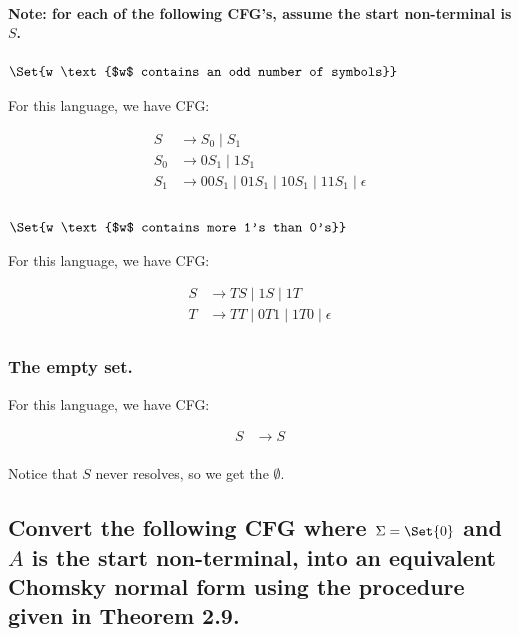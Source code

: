 \documentclass{article}
\providecommand\given{} %
\begin{document}
\paragraph{Note: for each of the following CFG's, assume the start non-terminal is $S$.}

\subsubsection{$\Set{w \given \text{$w$ contains an odd number of symbols}}$}

For this language, we have CFG:

\begin{align*}
	S   & \longrightarrow S_0 \;|\; S_1                                            \\
	S_0 & \longrightarrow 0S_1 \;|\; 1S_1                                          \\
	S_1 & \longrightarrow 00S_1 \;|\; 01S_1 \;|\; 10S_1 \;|\; 11S_1 \;|\; \epsilon \\
\end{align*}

\subsubsection{$\Set{w \given \text{$w$ contains more 1's than 0's}}$}

For this language, we have CFG:

\begin{align*}
	S & \longrightarrow TS \;|\; 1S \;|\; 1T                  \\
	T & \longrightarrow TT \;|\; 0T1 \;|\; 1T0 \;|\; \epsilon \\
\end{align*}

\subsubsection{The empty set.}

For this language, we have CFG:

\begin{align*}
	S & \longrightarrow S \\
\end{align*}

Notice that $S$ never resolves, so we get the $\emptyset$.


\subsection{Convert the following CFG where $\Sigma = \Set{0}$ and $A$ is the start non-terminal, into an equivalent Chomsky normal form using the procedure given in Theorem 2.9.}
\end{document}
